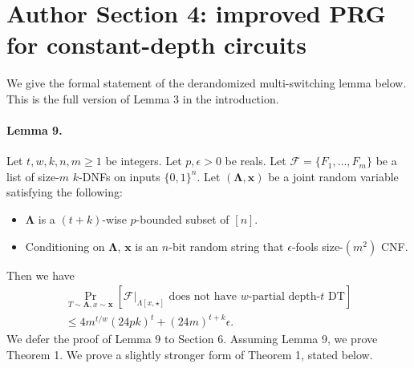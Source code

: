 \section*{Author Section 4: improved PRG for constant-depth circuits}
We give the formal statement of the derandomized multi-switching lemma below. This is the full version of Lemma 3 in the introduction.
\paragraph{Lemma 9.} Let $t,w,k,n,m\ge1$ be integers. Let $p,\epsilon>0$ be reals. Let $\mathcal F=\{F_1,\ldots,F_m\}$ be a list of size-$m$ $k$-DNFs on inputs $\{0,1\}^n$. Let $(\boldsymbol\Lambda,\boldsymbol x)$ be a joint random variable satisfying the following:
\begin{itemize}\item $\boldsymbol\Lambda$ is a $(t+k)$-wise $p$-bounded subset of $[n]$.
\item Conditioning on $\boldsymbol\Lambda$, $\boldsymbol x$ is an $n$-bit random string that $\epsilon$-fools size-$(m^2)$ CNF.\end{itemize}
Then we have
\begin{multline*}\Pr_{T\sim\boldsymbol\Lambda,x\sim\boldsymbol x}[\mathcal F|_{\Lambda[x,\star]}\text{ does not have }w\text{-partial depth-}t\text{ DT}]\\\le4m^{t/w}(24pk)^t+(24m)^{t+k}\epsilon.\end{multline*}
We defer the proof of Lemma 9 to Section 6. Assuming Lemma 9, we prove Theorem 1. We prove a slightly stronger form of Theorem 1, stated below.
